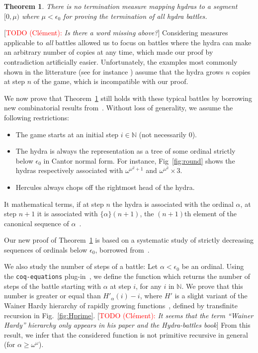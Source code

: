 \documentclass{easychair}
\newtheorem{theorem}{Theorem}
\newcommand{\canonseq}[2]{\mbox{$\{#1\}(#2)$}}
\newcommand{\TODO}[2][]{[\textcolor{red}{TODO (#1):} \emph{#2}]}
\begin{document}
\begin{theorem}
  There is no termination measure mapping hydras to a segment $[0,\mu)$ where $\mu<\epsilon_0$ for proving the termination of  all hydra battles.\label{thm3}
\end{theorem}

\TODO[Clément]{Is there a word missing above?}
Considering measures applicable to \emph{all} battles allowed us to
focus on battles where the hydra can make an arbitrary number of copies at any time, which made our proof by contradiction artificially easier.
Unfortunately, the examples  most commonly shown in the litterature
(see for instance \cite{KP82, bauer2008, BauerHydra}) 
assume that the hydra grows $n$ copies at step $n$ of the game, which is incompatible with our proof.

\vspace{6pt}

We now prove that Theorem~\ref{thm3} still holds with these typical battles by borrowing new combinatorial results from~\cite{KS81}.
Without loss of generality, we assume the following restrictions:
 
 \begin{itemize}
   \item The game starts at an initial step $i\in\mathbb{N}$ (not necessarily $0$).
   \item  The hydra is always the  representation as a tree of some ordinal strictly below $\epsilon_0$ in Cantor normal
     form. For instance, Fig~\ref{fig:round} shows the hydras respectively associated with  $\omega^{\omega^2+1}$ and $\omega^{\omega^2}\times 3$.
 
 \item Hercules always chops off the rightmost head of the hydra.
 \end{itemize}
 
 It mathematical terms, if at step $n$ the hydra is associated with the ordinal $\alpha$, at step $n+1$ it is associated with
 $\canonseq{\alpha}{n+1}$, the $(n+1)$th element of the canonical sequence of $\alpha$~\cite{KS81}.

 Our new proof of Theorem~\ref{thm3} is based on a systematic study of strictly decreasing sequences of ordinals below $\epsilon_0$, borrowed from~\cite{KS81}.
 
We also study the number of steps of a battle:
Let $\alpha<\epsilon_0$ be an ordinal.
Using the \texttt{coq-equations} plug-in~\cite{sozeau:hal-01671777}, we define the function which returns the number of steps of the battle starting with $\alpha$ at step $i$, for  any $i$ in $\mathbb{N}$.
We prove that this number is greater or equal than
$H'_\alpha(i)-i$, where $H'$ is a slight variant of the Wainer Hardy hierarchy of rapidly growing functions~\cite{BW85, KS81, Promel2013, Wainer1970}, defined by transfinite recursion in Fig.~\ref{fig:Hprime}. \TODO[Clément]{It seems that the term ``Wainer Hardy'' hierarchy only appears in his paper and the Hydra-battles book}
From this result, we infer that the considered function is not primitive recursive in general (for $\alpha\geq\omega^\omega$).
\end{document}
